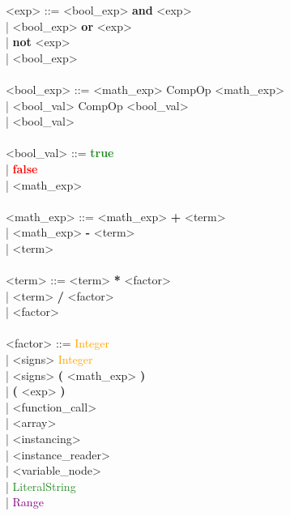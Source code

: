 \documentclass{Dokumentmall}
\begin{document}
\begin{tabbing}
  \><exp> \>::= \><bool\_exp> \textbf{and} <exp>\\
  \> \>| \> <bool\_exp> \textbf{or} <exp>\\
  \> \>| \> \textbf{not} <exp>\\
  \> \>| \> <bool\_exp>\\\\

  \><bool\_exp> \>::= \><math\_exp> CompOp <math\_exp>\\
  \> \>| \> <bool\_val> CompOp <bool\_val>\\
  \> \>| \> <bool\_val>\\\\

  \><bool\_val> \>::= \>\textbf{\textcolor{ForestGreen}{true}}\\
  \> \>| \> \textbf{\textcolor{red}{false}}\\
  \> \>| \> <math\_exp>\\\\

  \><math\_exp> \>::= \><math\_exp> \textbf{+} <term>\\
  \> \>| \> <math\_exp> \textbf{-} <term>\\
  \> \>| \> <term>\\\\

  \><term> \>::= \><term> \textbf{*} <factor>\\
  \> \>| \> <term> \textbf{/} <factor>\\
  \> \>| \> <factor>\\\\

  \><factor> \>::= \>\textcolor{orange}{Integer} \\
  \> \>| \> <signs> \textcolor{orange}{Integer}\\
  \> \>| \> <signs> \textbf{(} <math\_exp> \textbf{)}\\
  \> \>| \> \textbf{(} <exp> \textbf{)}\\
  \> \>| \> <function\_call>\\
  \> \>| \> <array>\\
  \> \>| \> <instancing>\\
  \> \>| \> <instance\_reader>\\
  \> \>| \> <variable\_node>\\
  \> \>| \> \textcolor{ForestGreen}{LiteralString}\\
  \> \>| \> \textcolor{Purple}{Range}\\\\


\end{tabbing}
\end{document}
